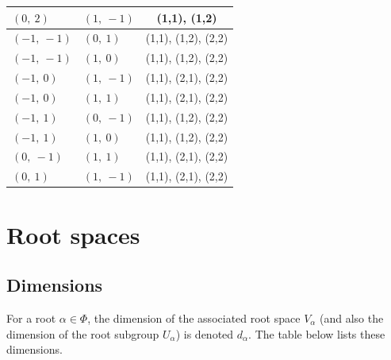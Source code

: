 \documentclass[11pt]{article}
\theoremstyle{definition}
\begin{document}
\begin{longtable}{|l|l|c|}
    \hline
    $\left( 0, \  2\right)$ & $\left( 1, \  -1\right)$ & (1,1), (1,2) \\
    \hline
    $\left( -1, \  -1\right)$ & $\left( 0, \  1\right)$ & (1,1), (1,2), (2,2) \\
    \hline
    $\left( -1, \  -1\right)$ & $\left( 1, \  0\right)$ & (1,1), (1,2), (2,2) \\
    \hline
    $\left( -1, \  0\right)$ & $\left( 1, \  -1\right)$ & (1,1), (2,1), (2,2) \\
    \hline
    $\left( -1, \  0\right)$ & $\left( 1, \  1\right)$ & (1,1), (2,1), (2,2) \\
    \hline
    $\left( -1, \  1\right)$ & $\left( 0, \  -1\right)$ & (1,1), (1,2), (2,2) \\
    \hline
    $\left( -1, \  1\right)$ & $\left( 1, \  0\right)$ & (1,1), (1,2), (2,2) \\
    \hline
    $\left( 0, \  -1\right)$ & $\left( 1, \  1\right)$ & (1,1), (2,1), (2,2) \\
    \hline
    $\left( 0, \  1\right)$ & $\left( 1, \  -1\right)$ & (1,1), (2,1), (2,2) \\
    \hline
\end{longtable}

\fi

\newpage
\section{Root spaces}

\subsection{Dimensions}

For a root $\alpha \in \Phi$, the dimension of the associated root space $V_\alpha$ (and also the dimension of the root subgroup $U_\alpha$) is denoted $d_\alpha$. The table below lists these dimensions.

\bigskip
\end{document}
